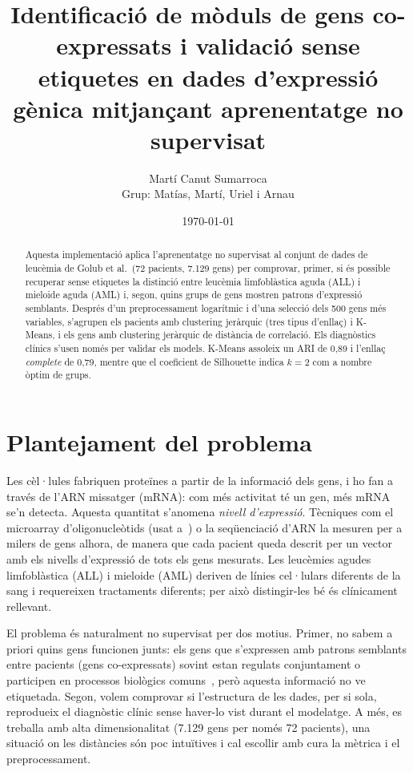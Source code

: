 \documentclass[11pt,a4paper]{article}
\title{Identificació de mòduls de gens co-expressats i validació sense etiquetes en dades d'expressió gènica mitjançant aprenentatge no supervisat}
\author{Martí Canut Sumarroca\\ \small Grup: Matías, Martí, Uriel i Arnau}
\date{\today}
\begin{document}
\maketitle

\begin{abstract}
Aquesta implementació aplica l'aprenentatge no supervisat al conjunt de dades de leucèmia de Golub et al.\ (72 pacients, 7.129 gens) per comprovar, primer, si és possible recuperar sense etiquetes la distinció entre leucèmia limfoblàstica aguda (ALL) i mieloide aguda (AML) i, segon, quins grups de gens mostren patrons d'expressió semblants. Després d'un preprocessament logarítmic i d'una selecció dels 500 gens més variables, s'agrupen els pacients amb clustering jeràrquic (tres tipus d'enllaç) i K-Means, i els gens amb clustering jeràrquic de distància de correlació. Els diagnòstics clínics s'usen només per validar els models. K-Means assoleix un ARI de 0,89 i l'enllaç \emph{complete} de 0,79, mentre que el coeficient de Silhouette indica $k=2$ com a nombre òptim de grups.
\end{abstract}

\vspace{0.4cm}
\section{Plantejament del problema}

Les cèl·lules fabriquen proteïnes a partir de la informació dels gens, i ho fan a través de l'ARN missatger (mRNA): com més activitat té un gen, més mRNA se'n detecta. Aquesta quantitat s'anomena \emph{nivell d'expressió}. Tècniques com el microarray d'oligonucleòtids (usat a~\cite{golub}) o la seqüenciació d'ARN la mesuren per a milers de gens alhora, de manera que cada pacient queda descrit per un vector amb els nivells d'expressió de tots els gens mesurats. Les leucèmies agudes limfoblàstica (ALL) i mieloide (AML) deriven de línies cel·lulars diferents de la sang i requereixen tractaments diferents; per això distingir-les bé és clínicament rellevant.

El problema és naturalment no supervisat per dos motius. Primer, no sabem a priori quins gens funcionen junts: els gens que s'expressen amb patrons semblants entre pacients (gens co-expressats) sovint estan regulats conjuntament o participen en processos biològics comuns~\cite{eisen}, però aquesta informació no ve etiquetada. Segon, volem comprovar si l'estructura de les dades, per si sola, reprodueix el diagnòstic clínic sense haver-lo vist durant el modelatge. A més, es treballa amb alta dimensionalitat (7.129 gens per només 72 pacients), una situació on les distàncies són poc intuïtives i cal escollir amb cura la mètrica i el preprocessament.
\end{document}

